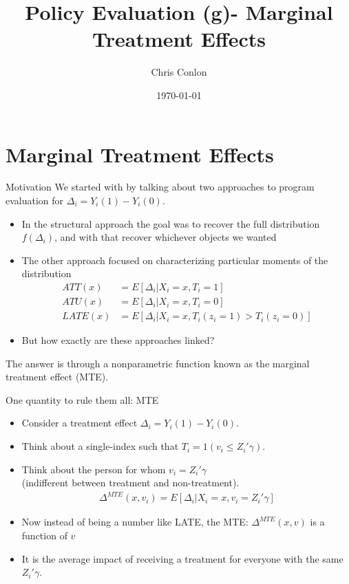 \documentclass[xcolor=pdftex,dvipsnames,table,mathserif,aspectratio=169]{beamer}
\begin{document}
\title{Policy Evaluation (g)- Marginal Treatment Effects}
\author{Chris Conlon}
\date{\today}

\maketitle
\section{Marginal Treatment Effects}


\begin{frame}{Motivation}
We started with by talking about two approaches to program evaluation for $\Delta_i = Y_i(1) - Y_i(0)$.
\begin{itemize}
\item In the \alert{structural approach} the goal was to recover the full distribution $f(\Delta_i)$, and with that recover whichever objects we wanted
\item The other approach focused on characterizing particular moments of the distribution
\begin{align*}
ATT(x) &= E[ \Delta_i | X_i=x, T_{i}=1]\\
ATU(x) &= E[ \Delta_i |  X_i=x,  T_{i}=0]\\
LATE(x) &= E[ \Delta_i |  X_i=x,  T_{i}(z_i=1) > T_{i}(z_i = 0)]
\end{align*}

\item But how exactly are these approaches linked?
\end{itemize}
The answer is through a \alert{nonparametric function} known as the \alert{marginal treatment effect} (MTE).
\end{frame}

\begin{frame}{One quantity to rule them all: MTE}
\begin{itemize}
\item Consider a treatment effect $\Delta_i = Y_{i}(1) - Y_{i}(0)$.
\item Think about a single-index such that $T_i = 1(v_i \leq Z_i' \gamma)$.
\item Think about the person for whom $v_i = Z_i'\gamma$\\
 (indifferent between treatment and non-treatment).
\begin{eqnarray*}
\Delta^{MTE}(x, v_i) = E[\Delta_i | X_i=x, v_i = Z_i'\gamma] 
\end{eqnarray*}
\item Now instead of being \alert{a number} like LATE, the MTE: $\Delta^{MTE}(x, v)$ is a \alert{function} of $v$
\item It is the average impact of receiving a treatment for everyone with the same $Z_i' \gamma$.
\end{itemize}
\end{frame}
\end{document}
